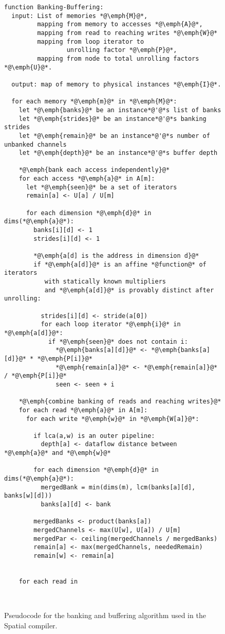 \begin{figure}

\begin{lstlisting}[language=Pseudo]
function Banking-Buffering: 
  input: List of memories *@\emph{M}@*,
         mapping from memory to accesses *@\emph{A}@*,
         mapping from read to reaching writes *@\emph{W}@*
         mapping from loop iterator to 
                 unrolling factor *@\emph{P}@*,
         mapping from node to total unrolling factors *@\emph{U}@*.     

  output: map of memory to physical instances *@\emph{I}@*.

  for each memory *@\emph{m}@* in *@\emph{M}@*:
    let *@\emph{banks}@* be an instance*@'@*s list of banks
    let *@\emph{strides}@* be an instance*@'@*s banking strides
    let *@\emph{remain}@* be an instance*@'@*s number of unbanked channels
    let *@\emph{depth}@* be an instance*@'@*s buffer depth

    *@\emph{bank each access independently}@*
    for each access *@\emph{a}@* in A[m]:  
      let *@\emph{seen}@* be a set of iterators
      remain[a] <- U[a] / U[m]

      for each dimension *@\emph{d}@* in dims(*@\emph{a}@*): 
        banks[i][d] <- 1
        strides[i][d] <- 1
        
        *@\emph{a[d] is the address in dimension d}@*
        if *@\emph{a[d]}@* is an affine *@function@* of iterators
           with statically known multipliers
           and *@\emph{a[d]}@* is provably distinct after unrolling:

          strides[i][d] <- stride(a[0])
          for each loop iterator *@\emph{i}@* in *@\emph{a[d]}@*:
            if *@\emph{seen}@* does not contain i: 
              *@\emph{banks[a][d]}@* <- *@\emph{banks[a][d]}@* * *@\emph{P[i]}@* 
              *@\emph{remain[a]}@* <- *@\emph{remain[a]}@* / *@\emph{P[i]}@*
              seen <- seen + i

    *@\emph{combine banking of reads and reaching writes}@*
    for each read *@\emph{a}@* in A[m]:  
      for each write *@\emph{w}@* in *@\emph{W[a]}@*:

        if lca(a,w) is an outer pipeline:
          depth[a] <- dataflow distance between *@\emph{a}@* and *@\emph{w}@*

        for each dimension *@\emph{d}@* in dims(*@\emph{a}@*): 
          mergedBank = min(dims(m), lcm(banks[a][d], banks[w][d])) 
          banks[a][d] <- bank

        mergedBanks <- product(banks[a])
        mergedChannels <- max(U[w], U[a]) / U[m]
        mergedPar <- ceiling(mergedChannels / mergedBanks)
        remain[a] <- max(mergedChannels, neededRemain)
        remain[w] <- remain[a]

    
    for each read in 
          


\end{lstlisting}

\caption{Pseudocode for the banking and buffering algorithm used in the Spatial compiler.}
\label{fig:banking}
\end{figure}